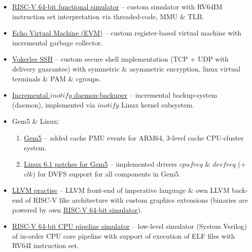     \begin{itemize}
        \item \href{https://github.com/Vokerlee/riscv64-simulator}
                   {RISC-V 64-bit functional simulator} -- custom simulator with RV64IM instruction set
            interpretation via threaded-code, MMU \& TLB.
        \item \href{https://github.com/Vokerlee/EVM}
                   {Echo Virtual Machine (EVM)} -- custom register-based virtual machine
            with incremental garbage collector.
        \item \href{https://github.com/Vokerlee/VSSH}
                   {Vokerlee SSH} -- custom secure shell implementation (TCP + UDP with delivery guarantee)
            with symmetric \& asymmetric encryption, linux virtual terminals \& PAM \& cgroups.
        \item \href{https://github.com/Vokerlee/linux-api-course/tree/master/5.%20Daemon-backuper}
                   {Incremental $inotify$ daemon-backuper} -- incremental backup-system (daemon), implemented 
            via $inotify$ Linux kernel subsystem.
        \item Gem5 \& Linux:
        \begin{enumerate}
            \item \href{https://github.com/Vokerlee/gem5-arm-dev}
                       {Gem5} -- added cache PMU events for ARM64, 3-level cache CPU-cluster system.
            \item \href{https://github.com/Vokerlee/linux-6.1-arm-gem5}
                       {Linux 6.1 patches for Gem5} -- implemented drivers $cpufreq$ \& $devfreq$   (+ $clk$)
                for DVFS support for all components in Gem5.
        \end{enumerate}
        \item \href{https://github.com/Vokerlee/llvm-practice}
                   {LLVM practise} -- LLVM front-end of imperative language \& own LLVM back-end of RISC-V like
            architecture with custom graphics extensions (binaries are powered by own \href{https://github.com/Vokerlee/riscv64-simulator/tree/griscv_llvm_sim}{RISC-V 64-bit simulator}).
        \item \href{https://github.com/Vokerlee/cpu-riscv64-pipeline}
                   {RISC-V 64-bit CPU pipeline simulator} -- low-level simulator (System Verilog) of in-order CPU
            core pipeline with support of execution of ELF files with RV64I instruction set.

    \end{itemize}

